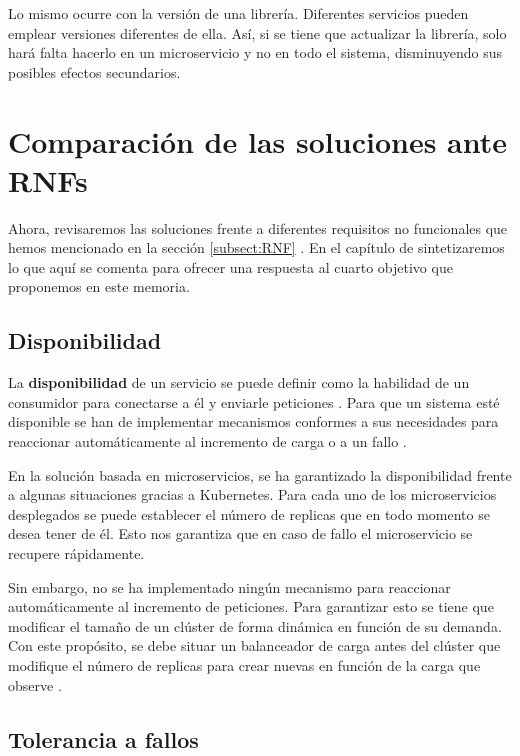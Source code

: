 \documentclass[11pt,spanish,listoffigures]{tfgetsinf}
\begin{document}
Lo mismo ocurre con la versión de una librería. Diferentes servicios pueden emplear versiones diferentes de ella. Así, si se tiene que actualizar la librería, solo hará falta hacerlo en un microservicio y no en todo el sistema, disminuyendo sus posibles efectos secundarios.

\section{Comparación de las soluciones ante RNFs}

Ahora, revisaremos las soluciones frente a diferentes requisitos no funcionales que hemos mencionado en la sección \ref{subsect:RNF} . En el capítulo de  sintetizaremos lo que aquí se comenta para ofrecer una respuesta al cuarto objetivo que proponemos en este memoria.

\subsection{Disponibilidad}

La \textbf{disponibilidad} de un servicio se puede definir como la habilidad de un consumidor para conectarse a él y enviarle peticiones \cite{Richards2016}. Para que un sistema esté disponible se han de implementar mecanismos conformes a sus necesidades para reaccionar automáticamente al incremento de carga o a un fallo \cite{Newman2015a}.

En la solución basada en microservicios, se ha garantizado la disponibilidad frente a algunas situaciones gracias a Kubernetes. Para cada uno de los microservicios desplegados se puede establecer el número de replicas que en todo momento se desea tener de él. Esto nos garantiza que en caso de fallo el microservicio se recupere rápidamente. 

Sin embargo, no se ha implementado ningún mecanismo para reaccionar automáticamente al incremento de peticiones. Para garantizar esto se tiene que modificar el tamaño de un clúster de forma dinámica en función de su demanda. Con este propósito, se debe situar un balanceador de carga antes del clúster que modifique el número de replicas para crear nuevas en función de la carga que observe \cite{Rensin2015}.

\subsection{Tolerancia a fallos}
\end{document}
